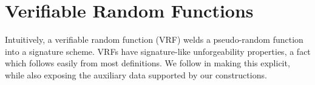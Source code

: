 \section{Verifiable Random Functions}
\label{sec:vrf}

Intuitively, a verifiable random function (VRF) welds a pseudo-random function into a signature scheme.
%
VRFs have signature-like unforgeability properties, a fact which follows easily from most definitions. 
We follow \cite{agg_dkg} in making this explicit, while also
 exposing the auxiliary data supported by our constructions. 







